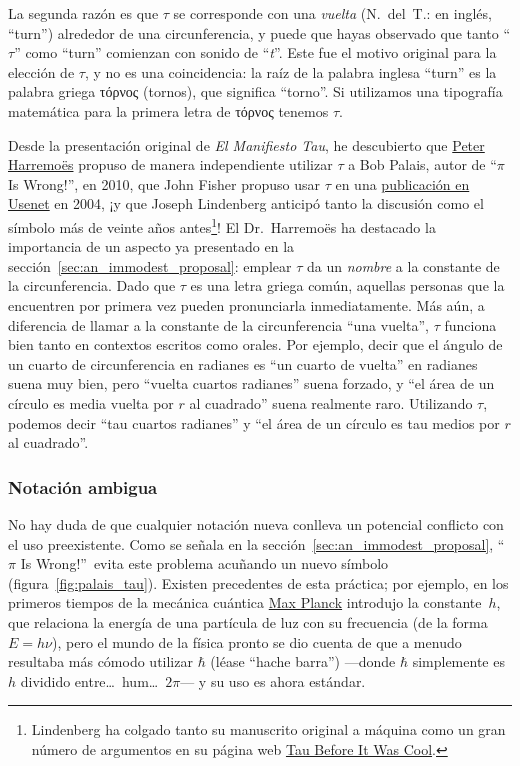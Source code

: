 La segunda razón es que $\tau$ se corresponde con una \emph{vuelta} (N.~del~T.: en inglés, ``turn'') alrededor de una circunferencia, y puede que hayas observado que tanto ``$\tau$'' como ``turn'' comienzan con sonido de ``\emph{t}''. Este fue el motivo original para la elección de $\tau$, y no es una coincidencia: la raíz de la palabra inglesa ``turn'' es la palabra griega τόρνος (tornos), que significa ``torno''. Si utilizamos una tipografía matemática para la primera letra de τόρνος tenemos $\tau$.

Desde la presentación original de \emph{El Manifiesto Tau}, he descubierto que \href{http://www.harremoes.dk/Peter/}{Peter Harremo\"{e}s} propuso de manera independiente utilizar $\tau$ a Bob Palais, autor de ``$\pi$ Is Wrong!'', en 2010, que John Fisher propuso usar $\tau$ en una \href{https://groups.google.com/forum/#!msg/sci.math/c-DHmJHSA0A/sLCoOtHB1UAJ}{publicación en Usenet} en 2004, ¡y que Joseph Lindenberg anticipó tanto la discusión como el símbolo más de veinte años antes\footnote{Lindenberg ha colgado tanto su manuscrito original a máquina como un gran número de argumentos en su página web \href{http://sites.google.com/site/taubeforeitwascool/}{Tau Before It Was Cool}.}! El Dr.~Harremo\"{e}s ha destacado la importancia de un aspecto ya presentado en la sección~\ref{sec:an_immodest_proposal}: emplear $\tau$ da un \emph{nombre} a la constante de la circunferencia. Dado que $\tau$ es una letra griega común, aquellas personas que la encuentren por primera vez pueden pronunciarla inmediatamente. Más aún, a diferencia de llamar a la constante de la circunferencia ``una vuelta'',
$\tau$ funciona bien tanto en contextos escritos como orales. Por ejemplo, decir que el ángulo de un cuarto de circunferencia en radianes es ``un cuarto de vuelta'' en radianes suena muy bien, pero ``vuelta cuartos radianes'' suena forzado, y ``el área de un círculo es media vuelta por $r$ al cuadrado'' suena realmente raro. Utilizando $\tau$, podemos decir ``tau cuartos radianes'' y ``el área de un círculo es tau medios por $r$ al cuadrado''.

    \subsubsection{Notación ambigua} %
    \label{sec:ambiguous_notation}

No hay duda de que cualquier notación nueva conlleva un potencial conflicto con el uso preexistente. Como se señala en la sección~\ref{sec:an_immodest_proposal}, ``$\pi$ Is Wrong!''\ evita este problema acuñando un nuevo símbolo (figura~\ref{fig:palais_tau}). Existen precedentes de esta práctica; por ejemplo, en los primeros tiempos de la mecánica cuántica \href{https://es.wikipedia.org/wiki/Max_Planck}{Max Planck} introdujo la constante~$h$, que relaciona la energía de una partícula de luz con su frecuencia (de la forma $E = h\nu$), pero el mundo de la física pronto se dio cuenta de que a menudo resultaba más cómodo utilizar $\hbar$ (léase ``hache barra'') ---donde $\hbar$ simplemente es $h$ dividido entre\ldots\ hum\ldots\ $2\pi$--- y su uso es ahora estándar. 

